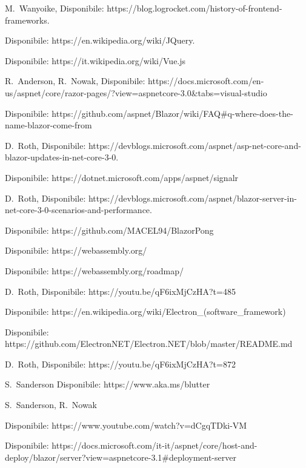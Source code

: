 \begin{thebibliography}{999}

M.~Wanyoike,
Disponibile: https://blog.logrocket.com/history-of-frontend-frameworks.

Disponibile: https://en.wikipedia.org/wiki/JQuery.

Disponibile: https://it.wikipedia.org/wiki/Vue.js

R.~Anderson,
R.~Nowak,
Disponibile: https://docs.microsoft.com/en-us/aspnet/core/razor-pages/?view=aspnetcore-3.0\&tabs=visual-studio

Disponibile: https://github.com/aspnet/Blazor/wiki/FAQ\#q-where-does-the-name-blazor-come-from

D.~Roth,
Disponibile: https://devblogs.microsoft.com/aspnet/asp-net-core-and-blazor-updates-in-net-core-3-0.

Disponibile: https://dotnet.microsoft.com/apps/aspnet/signalr

D.~Roth,
Disponibile: https://devblogs.microsoft.com/aspnet/blazor-server-in-net-core-3-0-scenarios-and-performance.

Disponibile: https://github.com/MACEL94/BlazorPong

Disponibile: https://webassembly.org/

Disponibile: https://webassembly.org/roadmap/

D.~Roth,
Disponibile:
https://youtu.be/qF6ixMjCzHA?t=485

Disponibile:
https://en.wikipedia.org/wiki/Electron\_(software\_framework)

Disponibile: https://github.com/ElectronNET/Electron.NET/blob/master/README.md

D.~Roth,
Disponibile: https://youtu.be/qF6ixMjCzHA?t=872

S.~Sanderson
Disponibile: https://www.aka.ms/blutter

S.~Sanderson, R.~Nowak

Disponibile: https://www.youtube.com/watch?v=dCgqTDki-VM

Disponibile: https://docs.microsoft.com/it-it/aspnet/core/host-and-deploy/blazor/server?view=aspnetcore-3.1\#deployment-server



\end{thebibliography}
